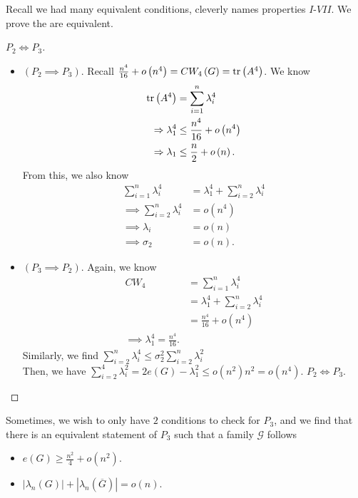 Recall we had many equivalent conditions, cleverly names properties \(I\)-\(VII\). We prove the are equivalent.
\begin{proof}[\(P_2 \iff P_3\)]
	\begin{itemize}
		\item \(\left( P_2 \implies P_3 \right) \). Recall \(\frac{n^{4}}{16} + o\left( n^{4} \right) = CW_4 \left( G \right)  = \operatorname{tr}\left( A^{4} \right) \). We know
			\begin{align*}
				\operatorname{tr} \left( A^{4} \right) &= \sum_{i= 1}^{n} \lambda_{i}^{4} \\
				\Rightarrow\lambda_1^{4} &\le \frac{n^{4}}{16} + o\left( n^{4} \right) \\
				\Rightarrow\lambda_1 &\le \frac{n}{2} + o\left( n \right)
			.\end{align*}
			From this, we also know
			\begin{align*}
			\sum_{i= 1}^{n} \lambda_{i}^{4} &= \lambda_1^{4} +\sum_{i=2}^{n} \lambda_{i}^{4}  \\
			\implies \sum_{i=2}^{n} \lambda_{i}^{4} &= o\left( n^{4} \right) \\
			\implies \lambda_{i} &= o\left( n \right) \\
			\implies \sigma_2 &= o\left( n \right)
		.\end{align*}
	\item \(\left( P_3 \implies P_2 \right) \). Again, we know
		\begin{align*}
			CW_4 &= \sum_{i= 1}^{n} \lambda_{i}^{4}\\
			&= \lambda_1^{4} + \sum_{i=2}^{n} \lambda_{i}^{4}\\
			&= \frac{n^{4}}{16} + o\left( n^{4} \right)  \\
			\implies \lambda_1^{4} = \frac{n^{4}}{16}
		.\end{align*}
		Similarly, we find \(\sum_{i=2}^{n} \lambda_{i}^{4} \le \sigma^2_2 \sum_{i=2}^{n} \lambda_{i}^2\)\\
		Then, we have \(\sum_{i=2}^{4} \lambda_{i}^2 = 2e\left( G \right) - \lambda_1^2 \le o\left( n^2 \right) n^2 = o\left( n^{4} \right) \). \(P_2 \iff P_3\).
	\end{itemize}
\end{proof}
\begin{remark}
	Sometimes, we wish to only have \(2\) conditions to check for \(P_3\), and we find that there is an equivalent statement of \(P_3\) such that a family \(\mathscr{G}\) follows
	\begin{itemize}
		\item \(e\left( G \right)  \ge \frac{n^2}{4} + o\left( n^2 \right) \).
		\item \(\left| \lambda_{n}\left( G \right)  \right| + \left| \lambda_{n}\left( \overline{G} \right)  \right|  = o\left( n \right)  \).
	\end{itemize}
\end{remark}
